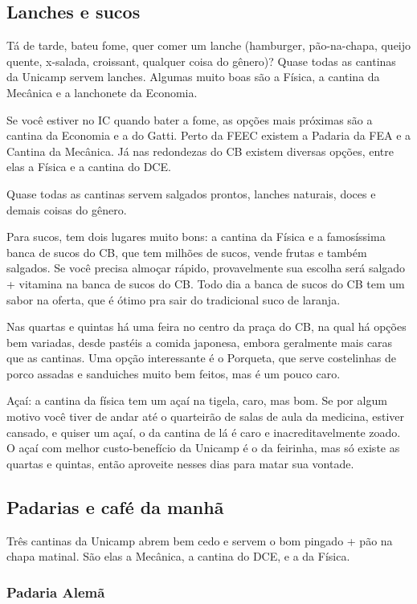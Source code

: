 \subsection{Lanches e sucos}

Tá de tarde, bateu fome, quer comer um lanche (hamburger, pão-na-chapa, queijo
quente, x-salada, croissant, qualquer coisa do gênero)? Quase todas as cantinas
da Unicamp servem lanches. Algumas muito boas são a Física, a cantina da Mecânica
e a lanchonete da Economia.

Se você estiver no IC quando bater a fome, as opções mais próximas
são a cantina da Economia e a do Gatti. Perto da FEEC existem a Padaria da FEA e
a Cantina da Mecânica. Já nas redondezas do CB existem diversas opções, entre
elas a Física e a cantina do DCE.

Quase todas as cantinas servem salgados prontos, lanches naturais, doces e
demais coisas do gênero.

Para sucos, tem dois lugares muito bons: a cantina da Física e a famosíssima
banca de sucos do CB, que tem milhões de sucos, vende frutas e também salgados.
Se você precisa almoçar rápido, provavelmente sua escolha será salgado +
vitamina na banca de sucos do CB. Todo dia a banca de sucos do CB tem um sabor
na oferta, que é ótimo pra sair do tradicional suco de laranja.

Nas quartas e quintas há uma feira no centro da praça do CB, na qual há opções bem
variadas, desde pastéis a comida japonesa, embora geralmente mais caras que as
cantinas. Uma opção interessante é o Porqueta, que serve costelinhas de porco
assadas e sanduiches muito bem feitos, mas é um pouco caro.

Açaí: a cantina da física tem um açaí na tigela, caro, mas bom. Se por algum
motivo você tiver de andar até o quarteirão de salas de aula da medicina,
estiver cansado, e quiser um açaí, o da cantina de lá é caro e
inacreditavelmente zoado. O açaí com melhor custo-benefício da Unicamp é o da 
feirinha, mas só existe as quartas e quintas, então aproveite nesses dias para
matar sua vontade.


\subsection{Padarias e café da manhã}

Três cantinas da Unicamp abrem bem cedo e servem o bom pingado + pão na chapa
matinal. São elas a Mecânica, a cantina do DCE, e a da Física.

\subsubsection{Padaria Alemã}

